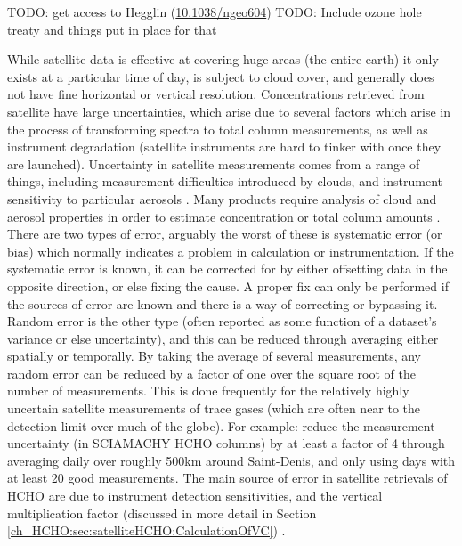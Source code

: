       TODO: get access to Hegglin (\url{10.1038/ngeo604}) \citep{Hegglin2009}
      TODO: Include ozone hole treaty and things put in place for that
      
      While satellite data is effective at covering huge areas (the entire earth) it only exists at a particular time of day, is subject to cloud cover, and generally does not have fine horizontal or vertical resolution.
      Concentrations retrieved from satellite have large uncertainties, which arise due to several factors which arise in the process of transforming spectra to total column measurements, as well as instrument degradation (satellite instruments are hard to tinker with once they are launched).
      Uncertainty in satellite measurements comes from a range of things, including measurement difficulties introduced by clouds, and instrument sensitivity to particular aerosols \citep{Millet2006}.
      Many products require analysis of cloud and aerosol properties in order to estimate concentration or total column amounts \citep{Palmer2001,Palmer2003, Marais2012, Vasilkov2017}.
      There are two types of error, arguably the worst of these is systematic error (or bias) which normally indicates a problem in calculation or instrumentation.
      If the systematic error is known, it can be corrected for by either offsetting data in the opposite direction, or else fixing the cause.
      A proper fix can only be performed if the sources of error are known and there is a way of correcting or bypassing it.
      Random error is the other type (often reported as some function of a dataset's variance or else uncertainty), and this can be reduced through averaging either spatially or temporally. 
      By taking the average of several measurements, any random error can be reduced by a factor of one over the square root of the number of measurements.
      This is done frequently for the relatively highly uncertain satellite measurements of trace gases (which are often near to the detection limit over much of the globe).
      For example: \citet{Vigouroux2009} reduce the measurement uncertainty (in SCIAMACHY HCHO columns) by at least a factor of 4 through averaging daily over roughly 500km around Saint-Denis, and only using days with at least 20 good measurements.
      The main source of error in satellite retrievals of HCHO are due to instrument detection sensitivities, and the vertical multiplication factor (discussed in more detail in Section \ref{ch_HCHO:sec:satelliteHCHO:CalculationOfVC}) \citep{Millet2006}.
      
